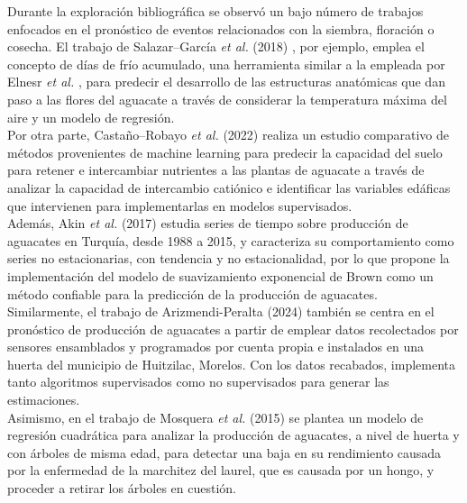 Durante la exploración bibliográfica se observó un bajo número de trabajos enfocados en el pronóstico de eventos relacionados con la siembra, floración o cosecha. El trabajo de Salazar--García \textit{et al.} (2018) \cite{Salazar_2018}, por ejemplo, emplea el concepto de días de frío acumulado, una herramienta similar a la empleada por Elnesr \textit{et al.} \cite{Elnesr_2016, Elnesr_2013}, para predecir el desarrollo de las estructuras anatómicas que dan paso a las flores del aguacate a través de considerar la temperatura máxima del aire y un modelo de regresión.\\

Por otra parte, Castaño--Robayo \textit{et al.} (2022) \cite{Castaño_2022} realiza un estudio comparativo de métodos provenientes de machine learning para predecir la capacidad del suelo para retener e intercambiar nutrientes a las plantas de aguacate a través de analizar la capacidad de intercambio catiónico e identificar las variables edáficas que intervienen para implementarlas en modelos supervisados.\\ 


Además, Akin \textit{et al.} (2017) \cite{Akin_2017} estudia series de tiempo sobre producción de aguacates en Turquía, desde 1988 a 2015, y caracteriza su comportamiento como series no estacionarias, con tendencia y no estacionalidad, por lo que propone la implementación del modelo de suavizamiento exponencial de Brown como un método confiable para la predicción de la producción de aguacates.\\

Similarmente, el trabajo de Arizmendi-Peralta (2024) \cite{ARIZMENDIPERALTA2024} también se centra en el pronóstico de producción de aguacates a partir de emplear datos recolectados por sensores ensamblados y programados por cuenta propia e instalados en una huerta del municipio de Huitzilac, Morelos. Con los datos recabados, implementa tanto algoritmos supervisados como no supervisados para generar las estimaciones.\\

Asimismo, en el trabajo de Mosquera \textit{et al.} (2015) \cite{Mosquera_2015} se plantea un modelo de regresión cuadrática para analizar la producción de aguacates, a nivel de huerta y con árboles de misma edad, para detectar una baja en su rendimiento causada por la enfermedad de la marchitez del laurel, que es causada por un hongo, y proceder a retirar los árboles en cuestión.\\

